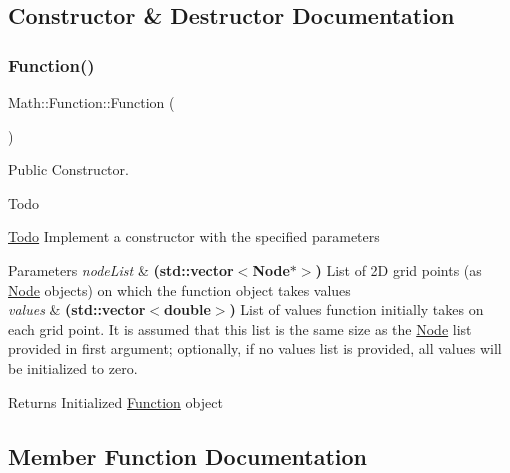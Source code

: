 \subsection{Constructor \& Destructor Documentation}
\mbox{\label{class_math_1_1_function_a97e51108b0374f8adc7982f92af4d0de}} 
\subsubsection{\texorpdfstring{Function()}{Function()}}
{\footnotesize\ttfamily Math\+::\+Function\+::\+Function (\begin{DoxyParamCaption}{ }\end{DoxyParamCaption})\hspace{0.3cm}{\ttfamily [inline]}}



Public Constructor. 

\begin{DoxyRefDesc}{Todo}
\item[\mbox{\hyperlink{todo__todo000003}{Todo}}]Implement a constructor with the specified parameters \end{DoxyRefDesc}

\begin{DoxyParams}{Parameters}
{\em node\+List} & {\bfseries (std\+::vector$<$\+Node$\ast$$>$)} List of 2D grid points (as \mbox{\hyperlink{class_node}{Node}} objects) on which the function object takes values \\
\hline
{\em values} & {\bfseries (std\+::vector$<$double$>$)} List of values function initially takes on each grid point. It is assumed that this list is the same size as the \mbox{\hyperlink{class_node}{Node}} list provided in first argument; optionally, if no values list is provided, all values will be initialized to zero. \\
\hline
\end{DoxyParams}
\begin{DoxyReturn}{Returns}
Initialized \mbox{\hyperlink{class_math_1_1_function}{Function}} object 
\end{DoxyReturn}


\subsection{Member Function Documentation}
\mbox{\label{class_math_1_1_function_ad85e716accc64c1ea4962c828c4e216c}} 
